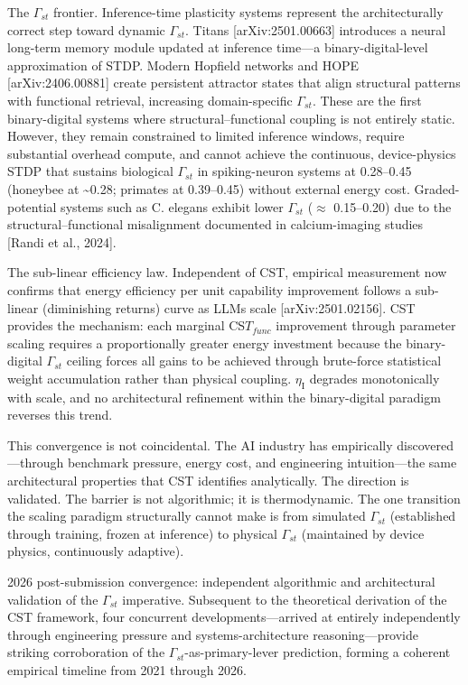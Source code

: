 \documentclass[a4paper,12pt]{article}
\begin{document}
The $\Gamma_{st}$ frontier.
Inference-time plasticity systems represent the architecturally correct step toward dynamic $\Gamma_{st}$.
Titans [arXiv:2501.00663] introduces a neural long-term memory module updated at inference time---a binary-digital-level approximation of STDP.
Modern Hopfield networks and HOPE [arXiv:2406.00881] create persistent attractor states that align structural patterns with functional retrieval, increasing domain-specific $\Gamma_{st}$.
These are the first binary-digital systems where structural--functional coupling is not entirely static.
However, they remain constrained to limited inference windows, require substantial overhead compute, and cannot achieve the continuous, device-physics STDP that sustains biological $\Gamma_{st}$ in spiking-neuron systems at 0.28--0.45 (honeybee at \textasciitilde{}0.28; primates at 0.39--0.45) without external energy cost.
Graded-potential systems such as C. elegans exhibit lower $\Gamma_{st}$ ($\approx$ 0.15--0.20) due to the structural--functional misalignment documented in calcium-imaging studies [Randi et al., 2024].


The sub-linear efficiency law.
Independent of CST, empirical measurement now confirms that energy efficiency per unit capability improvement follows a sub-linear (diminishing returns) curve as LLMs scale [arXiv:2501.02156].
CST provides the mechanism: each marginal CS$T_{func}$ improvement through parameter scaling requires a proportionally greater energy investment because the binary-digital $\Gamma_{st}$ ceiling forces all gains to be achieved through brute-force statistical weight accumulation rather than physical coupling. $\eta_{\text{I}}$ degrades monotonically with scale, and no architectural refinement within the binary-digital paradigm reverses this trend.


This convergence is not coincidental.
The AI industry has empirically discovered---through benchmark pressure, energy cost, and engineering intuition---the same architectural properties that CST identifies analytically.
The direction is validated.
The barrier is not algorithmic; it is thermodynamic.
The one transition the scaling paradigm structurally cannot make is from simulated $\Gamma_{st}$ (established through training, frozen at inference) to physical $\Gamma_{st}$ (maintained by device physics, continuously adaptive).


2026 post-submission convergence: independent algorithmic and architectural validation of the $\Gamma_{st}$ imperative. Subsequent to the theoretical derivation of the CST framework, four concurrent developments---arrived at entirely independently through engineering pressure and systems-architecture reasoning---provide striking corroboration of the $\Gamma_{st}$-as-primary-lever prediction, forming a coherent empirical timeline from 2021 through 2026.
\end{document}
